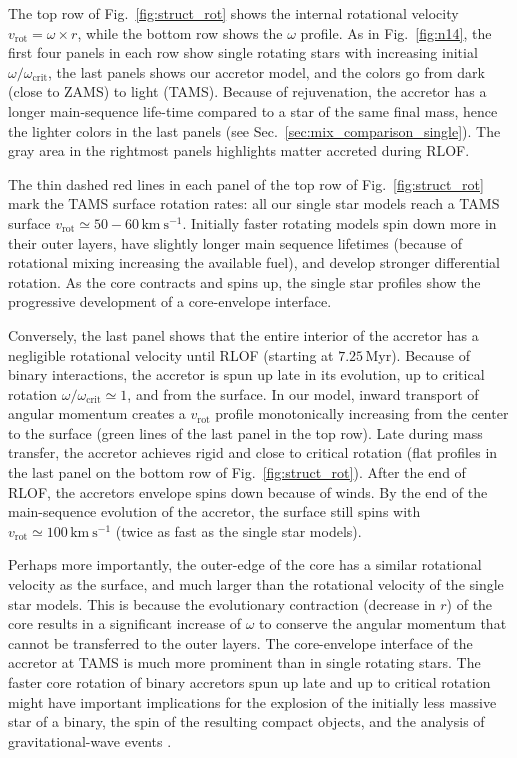\documentclass[twocolumn,twocolappendix,trackchanges]{aastex63}
\newcommand{\kms}{{\mathrm{km\ s^{-1}}}}
\DeclareRobustCommand{\Figref}[1]{Fig.~\ref{#1}}
\DeclareRobustCommand{\Secref}[1]{Sec.~\ref{#1}}
\begin{document}
The top row of \Figref{fig:struct_rot} shows the internal rotational
velocity $v_\mathrm{rot}=\omega\times r$, while the bottom row shows
the $\omega$ profile. As in \Figref{fig:n14}, the first four panels in
each row show single rotating stars with increasing initial
$\omega/\omega_\mathrm{crit}$, the last panels shows our accretor
model, and the colors go from dark (close to ZAMS) to light
(TAMS). Because of rejuvenation, the accretor has a longer
main-sequence life-time compared to a star of the same final mass,
hence the lighter colors in the last panels (see
\Secref{sec:mix_comparison_single}). The gray area in the rightmost
panels highlights matter accreted during RLOF.

The thin dashed red lines in each panel of the top row of
\Figref{fig:struct_rot} mark the TAMS surface rotation rates: all our
single star models reach a TAMS surface
$v_\mathrm{rot}\simeq50-60\,\kms$. Initially faster rotating models
spin down more in their outer layers, have slightly longer main
sequence lifetimes (because of rotational mixing increasing the
available fuel), and develop stronger differential rotation. As the
core contracts and spins up, the single star profiles show the
progressive development of a core-envelope interface.

Conversely, the last panel shows that the entire interior of the
accretor has a negligible rotational velocity until RLOF (starting at
$7.25$\,Myr). Because of binary interactions, the accretor is spun up
late in its evolution, up to critical rotation
$\omega/\omega_\mathrm{crit}\simeq1$, and from the surface. In our model,
inward transport of angular momentum creates a $v_\mathrm{rot}$
profile monotonically increasing from the center to the surface (green lines of
the last panel in the top row). Late during mass transfer, the accretor achieves rigid
and close to critical rotation (flat profiles in the last panel on the
bottom row of \Figref{fig:struct_rot}). After the end
of RLOF, the accretors envelope spins down because of winds. By the
end of the main-sequence evolution of the accretor, the surface still
spins with $v_\mathrm{rot}\simeq100\,\kms$ (twice as fast as the
single star models).

Perhaps more importantly, the outer-edge of the core has a similar
rotational velocity as the surface, and much larger than the
rotational velocity of the single star models. This is because the
evolutionary contraction (decrease in $r$) of the core results in a
significant increase of $\omega$ to conserve the angular momentum that
cannot be transferred to the outer layers. The core-envelope interface
of the accretor at TAMS is much more prominent than in single rotating
stars. The faster core rotation of binary accretors spun up late and
up to critical rotation might have important implications for the
explosion of the initially less massive star of a binary, the
spin of the resulting compact objects, and the analysis of
gravitational-wave events \citep[e.g.,][]{zaldarriaga:18, qin:18, callister:21}.
\end{document}
